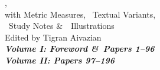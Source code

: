 \begin{center}
{{,\\
with Metric Measures, \totalnfncs\ Textual Variants,\\
\totalnfnsts\ Study Notes \&\ \totalfigures\ Illustrations\\[2ex]
}
Edited by Tigran Aivazian\\[2ex]
}%
\ifmultivol
\LARGE\bfseries\itshape
\ifvoli Volume I: Foreword \&\ Papers 1--96\\\fi
\ifvolii Volume II: Papers 97--196\\\fi
\fi
{}
\titlesepbig\\
\end{center}

\titleframe

\newpage


